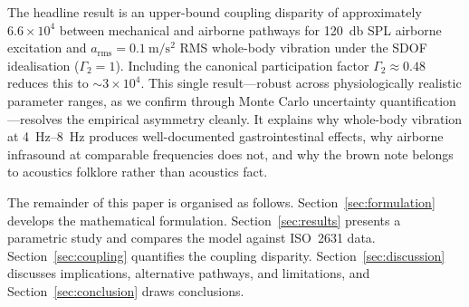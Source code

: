 The headline result is an upper-bound coupling disparity of approximately
$6.6 \times 10^4$ between mechanical and airborne pathways for
\SI{120}{\decibel} SPL airborne excitation and
$a_\mathrm{rms} = \SI{0.1}{\metre\per\second\squared}$ RMS whole-body
vibration under the SDOF idealisation ($\Gamma_2 = 1$).  Including the
canonical participation factor $\Gamma_2 \approx 0.48$ reduces this to
$\sim 3 \times 10^4$.  This single result---robust across physiologically
realistic parameter ranges, as we confirm through Monte Carlo uncertainty
quantification---resolves the empirical asymmetry cleanly.  It
explains why whole-body vibration at \SIrange{4}{8}{\hertz} produces
well-documented gastrointestinal effects, why airborne infrasound at
comparable frequencies does not, and why the brown note belongs to acoustics
folklore rather than acoustics fact.

The remainder of this paper is organised as follows.
Section~\ref{sec:formulation} develops the mathematical formulation.
Section~\ref{sec:results} presents a parametric study and compares the model
against ISO~2631 data.  Section~\ref{sec:coupling} quantifies the coupling
disparity.  Section~\ref{sec:discussion} discusses implications, alternative
pathways, and limitations, and Section~\ref{sec:conclusion} draws conclusions.
